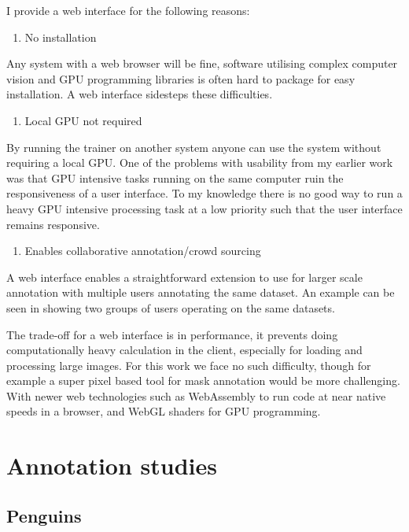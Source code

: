 I provide a web interface for the following reasons:

\begin{enumerate}
    \item No installation
\end{enumerate}
Any system with a web browser will be fine, software utilising complex computer vision and GPU programming libraries is often hard to package for easy installation. A web interface sidesteps these difficulties.
\begin{enumerate}[resume]
    \item Local GPU not required
\end{enumerate}
By running the trainer on another system anyone can use the system without requiring a local GPU. One of the problems with usability from my earlier work was that GPU intensive tasks running on the same computer ruin the responsiveness of a user interface. To my knowledge there is no good way to run a heavy \gls{GPU} intensive processing task at a low priority such that the user interface remains responsive.
\begin{enumerate}[resume]
    \item Enables collaborative annotation/crowd sourcing
\end{enumerate}
A web interface enables a straightforward extension to use for larger scale annotation with multiple users annotating the same dataset. An example can be seen in \label{fig:connectivity} showing two groups of users operating on the same datasets.


The trade-off for a web interface is in performance, it prevents doing computationally heavy calculation in the client, especially for loading and processing large images. For this work we face no such difficulty, though for example a super pixel based tool for mask annotation would be more challenging. With newer web technologies such as WebAssembly \cite{Haas2017} to run code at near native speeds in a browser, and WebGL shaders for GPU programming.











\section{Annotation studies}

\subsection {Penguins}
